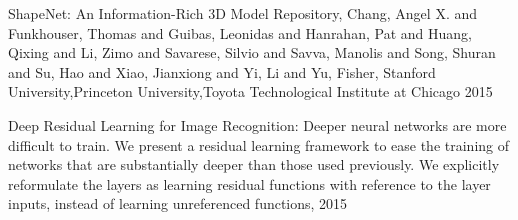 \begin{thebibliography}{1}

   ShapeNet: An Information-Rich 3D Model Repository,
 Chang, Angel X. and Funkhouser, Thomas and Guibas, Leonidas and Hanrahan, Pat and Huang, Qixing and Li, Zimo and Savarese, Silvio and Savva, Manolis and Song, Shuran and Su, Hao and Xiao, Jianxiong and Yi, Li and Yu, Fisher, Stanford University,Princeton University,Toyota Technological Institute at Chicago 2015 

 Deep Residual Learning for Image Recognition: Deeper neural networks are more difficult to train. We
present a residual learning framework to ease the training
of networks that are substantially deeper than those used
previously. We explicitly reformulate the layers as learning
residual functions with reference to the layer inputs, instead
of learning unreferenced functions, 2015
\end{thebibliography}